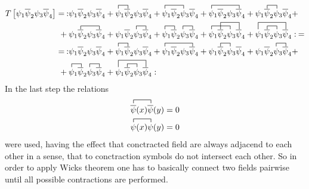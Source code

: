 \begin{align*}
		T\left[\psi_1\overline{\psi}_2\psi_3\overline{\psi}_4\right]=\:
		:&\psi_1\overline{\psi}_2\psi_3\overline{\psi}_4+
		\contraction{}{\psi}{{}_1}{\psi}\psi_1\overline{\psi}_2\psi_3\overline{\psi}_4+
		\contraction{}{\psi}{\psi_2{}_3}{\psi}\psi_1\overline{\psi}_2\psi_3\overline{\psi}_4+
		\contraction{}{\psi}{\psi_2\psi_3{}_4}{\psi}\psi_1\overline{\psi}_2\psi_3\overline{\psi}_4+
		\contraction{\psi_1}{\psi}{{}_1}{\psi}\psi_1\overline{\psi}_2\psi_3\overline{\psi}_4+\\
		+\:\contraction{\psi_1}{\psi}{\psi_2{}_3}{\psi}&\psi_1\overline{\psi}_2\psi_3\overline{\psi}_4+
		\contraction{\psi_1\psi_2}{\psi}{{}_4}{\psi}\psi_1\overline{\psi}_2\psi_3\overline{\psi}_4+
		\contraction{}{\psi}{{}_1}{\bar{\psi}}\contraction{\psi_1\psi_2}{\psi}{{}_3}{\bar{\psi}}\psi_1\overline{\psi}_2\psi_3\overline{\psi}_4+
		\contraction{}{\psi}{{}_1\psi_2}{\psi}\contraction[2ex]{\psi_1}{\psi}{{}_2\psi_3}{\psi}\psi_1\overline{\psi}_2\psi_3\overline{\psi}_4+
		\contraction[2ex]{}{\psi}{{}_1\psi_2\psi_3}{\psi}\contraction{\psi_1}{\psi}{{}_2}{\psi}\psi_1\overline{\psi}_2\psi_3\overline{\psi}_4:\:=\\
		=\::&\psi_1\overline{\psi}_2\psi_3\overline{\psi}_4+\contraction{}{\psi}{{}_1}{\psi}\psi_1\overline{\psi}_2\psi_3\overline{\psi}_4+\contraction{}{\psi}{\psi_2\psi_3{}_4}{\psi}\psi_1\overline{\psi}_2\psi_3\overline{\psi}_4+\contraction{\psi_1}{\psi}{{}_1}{\psi}\psi_1\overline{\psi}_2\psi_3\overline{\psi}_4+\contraction{\psi_1\psi_2}{\psi}{{}_4}{\psi}\psi_1\overline{\psi}_2\psi_3\overline{\psi}_4+\\
		+\:\contraction{}{\psi}{{}_1}{\bar{\psi}}\contraction{\psi_1\psi_2}{\psi}{{}_3}{\bar{\psi}}&\psi_1\overline{\psi}_2\psi_3\overline{\psi}_4+\contraction[2ex]{}{\psi}{{}_1\psi_2\psi_3}{\psi}\contraction{\psi_1}{\psi}{{}_2}{\psi}\psi_1\overline{\psi}_2\psi_3\overline{\psi}_4:
\end{align*}
In the last step the relations
\begin{align}
	\contraction{}{\overline{\psi}}{(x)}{\bar{\psi}}
	\overline{{\psi}}(x)\overline{\psi}(y)=0
	\label{eq:selfcontraction1}
	\\
	\contraction{}{\psi}{(x)}{\psi}
	\psi(x)\psi(y)=0
	\label{eq:selfcontraction2}
\end{align}
were used, having the effect that conctracted field are always adjacend to each other in a sense, that to conctraction symbols do not intersect each other.\newline
So in order to apply Wicks theorem one has to basically connect two fields pairwise until all possible contractions are performed. \newline
